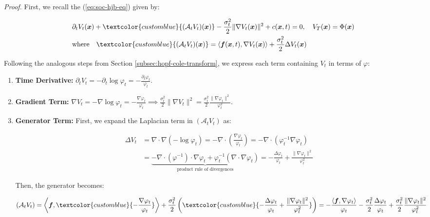 \documentclass{article}
\newcommand{\bluetext}[1]{\textcolor{customblue}{#1}}
\begin{document}
\textit{Proof. } First, we recall the (\ref{eq:soc-hjb-eq}) given by:
\begin{small}
\begin{align}
    &\partial_tV_t(\boldsymbol{x})+\bluetext{(\mathcal{A}_tV_t)(\boldsymbol{x})}-\frac{\sigma_t^2}{2}\|\nabla V_t(\boldsymbol{x})\|^2+c(\boldsymbol{x},t)=0, \quad V_T(\boldsymbol{x})=\Phi(\boldsymbol{x})\label{eq:proof-value-hjb}\\
    &\text{where}\quad \bluetext{(\mathcal{A}_tV_t)(\boldsymbol{x})}= \langle\boldsymbol{f}(\boldsymbol{x},t), \nabla V_t(\boldsymbol{x})\rangle+\frac{\sigma_t^2}{2}\Delta V_t(\boldsymbol{x})
\end{align}
\end{small}
Following the analogous steps from Section \ref{subsec:hopf-cole-transform}, we express each term containing $V_t$ in terms of $\varphi$:
\begin{enumerate}
    \item[(i)] \textbf{Time Derivative:} $\partial_tV_t=-\partial_t\log \varphi_t=-\frac{\partial_t\varphi_t}{\varphi_t}$.
    \item[(ii)] \textbf{Gradient Term:} $\nabla V_t=-\nabla \log \varphi_t=-\frac{\nabla \varphi_t}{\varphi_t}\implies \frac{\sigma_t^2}{2}\|\nabla V_t\|^2=\frac{\sigma_t^2}{2}\frac{\|\nabla \varphi_t\|^2}{\varphi_t^2}$.
    \item[(iii)] \textbf{Generator Term:} First, we expand the Laplacian term in $(\mathcal{A}_tV_t)$ as: 
    \begin{small}
    \begin{align}
        \Delta V_t&=\nabla\cdot\nabla (-\log\varphi_t)=-\nabla\cdot\left(\frac{\nabla \varphi_t}{\varphi_t}\right)=-\nabla\cdot(\varphi_t^{-1}\nabla \varphi_t)\nonumber\\
        &=\underbrace{-\nabla\cdot (\varphi^{-1})\cdot \nabla \varphi_t+\varphi_t^{-1}(\nabla \cdot \nabla \varphi_t)}_{\text{product rule of divergences}}=-\frac{\Delta \varphi_t}{\varphi_t}+\frac{\|\nabla \varphi_t\|^2}{\varphi_t^2}
    \end{align}
    \end{small}
    Then, the generator becomes:
    \begin{small}
    \begin{align}
        (\mathcal{A}_tV_t)&=\bigg\langle \boldsymbol{f}, \bluetext{-\frac{\nabla \varphi_t}{\varphi_t}}\bigg\rangle+\frac{\sigma_t^2}{2}\left(\bluetext{-\frac{\Delta \varphi_t}{\varphi_t}+\frac{\|\nabla \varphi_t\|^2}{\varphi_t^2}}\right)=-\frac{\langle\boldsymbol{f}, \nabla \varphi_t\rangle}{\varphi_t}-\frac{\sigma_t^2}{2}\frac{\Delta\varphi_t}{\varphi_t}+\frac{\sigma_t^2}{2}\frac{\|\nabla \varphi_t\|^2}{\varphi_t^2}
    \end{align}
    \end{small}
\end{enumerate}
\end{document}
